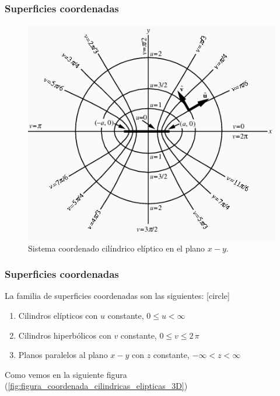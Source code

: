 \begin{frame}
\frametitle{Superficies coordenadas}
\begin{figure}[H]
    \centering
    \includegraphics[scale=0.4]{Imagenes/EllipticCylindricalCoord_1000.png}
    \caption{Sistema coordenado cilíndrico elíptico en el plano $x-y$.}
    \label{fig:figura_coordenada_cilindricas_elipticas}
\end{figure}
\end{frame}
\begin{frame}
\frametitle{Superficies coordenadas}
La familia de superficies coordenadas son las siguientes:
[circle]
\begin{enumerate}
\item Cilindros elípticos con $u$ constante, $0 \leq u < \infty$
\item Cilindros hiperbólicos con $v$ constante, $0 \leq v \leq 2 \, \pi$
\item Planos paralelos al plano $x-y$ con $z$ constante, $-\infty < z < \infty$
\end{enumerate}
Como vemos en la siguiente figura (\ref{fig:figura_coordenada_cilindricas_elipticas_3D})
\end{frame}
